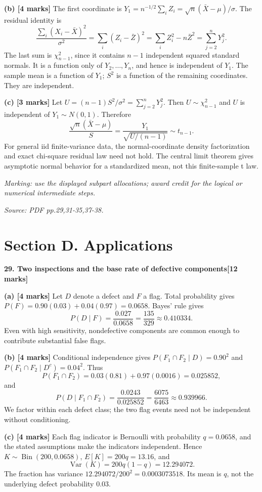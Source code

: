 \documentclass[11pt,a4paper]{article}
\begin{document}
\textbf{(b) [4 marks]} The first coordinate is \(Y_1=n^{-1/2}\sum_iZ_i=\sqrt n(\bar X-\mu)/\sigma\). The residual identity is \[\frac{\sum_i(X_i-\bar X)^2}{\sigma^2}=\sum_i(Z_i-\bar Z)^2=\sum_iZ_i^2-n\bar Z^2=\sum_{j=2}^nY_j^2.\] The last sum is \(\chi^2_{n-1}\), since it contains \(n-1\) independent squared standard normals. It is a function only of \(Y_2,\ldots,Y_n\), and hence is independent of \(Y_1\). The sample mean is a function of \(Y_1\); \(S^2\) is a function of the remaining coordinates. They are independent.

\textbf{(c) [3 marks]} Let \(U=(n-1)S^2/\sigma^2=\sum_{j=2}^nY_j^2\). Then \(U\sim\chi^2_{n-1}\) and \(U\) is independent of \(Y_1\sim N(0,1)\). Therefore \[\frac{\sqrt n(\bar X-\mu)}{S}=\frac{Y_1}{\sqrt{U/(n-1)}}\sim t_{n-1}.\] For general iid finite-variance data, the normal-coordinate density factorization and exact chi-square residual law need not hold. The central limit theorem gives asymptotic normal behavior for a standardized mean, not this finite-sample t law.

\textit{Marking: use the displayed subpart allocations; award credit for the logical or numerical intermediate steps.}\par
{\footnotesize\textit{Source: PDF pp.29,31-35,37-38.}}
\newpage\section*{Section D. Applications}
\textbf{29. Two inspections and the base rate of defective components}\hfill\textbf{[12 marks]}\par\medskip
\textbf{(a) [4 marks]} Let \(D\) denote a defect and \(F\) a flag. Total probability gives \(P(F)=0.90(0.03)+0.04(0.97)=0.0658\). Bayes' rule gives \[P(D\mid F)=\frac{0.027}{0.0658}=\frac{135}{329}\approx0.410334.\] Even with high sensitivity, nondefective components are common enough to contribute substantial false flags.

\textbf{(b) [4 marks]} Conditional independence gives \(P(F_1\cap F_2\mid D)=0.90^2\) and \(P(F_1\cap F_2\mid D^c)=0.04^2\). Thus \[P(F_1\cap F_2)=0.03(0.81)+0.97(0.0016)=0.025852,\] and \[P(D\mid F_1\cap F_2)=\frac{0.0243}{0.025852}=\frac{6075}{6463}\approx0.939966.\] We factor within each defect class; the two flag events need not be independent without conditioning.

\textbf{(c) [4 marks]} Each flag indicator is Bernoulli with probability \(q=0.0658\), and the stated assumptions make the indicators independent. Hence \(K\sim\operatorname{Bin}(200,0.0658)\), \(E[K]=200q=13.16\), and \[\operatorname{Var}(K)=200q(1-q)=12.294072.\] The fraction has variance \(12.294072/200^2=0.0003073518\). Its mean is \(q\), not the underlying defect probability \(0.03\).
\end{document}

